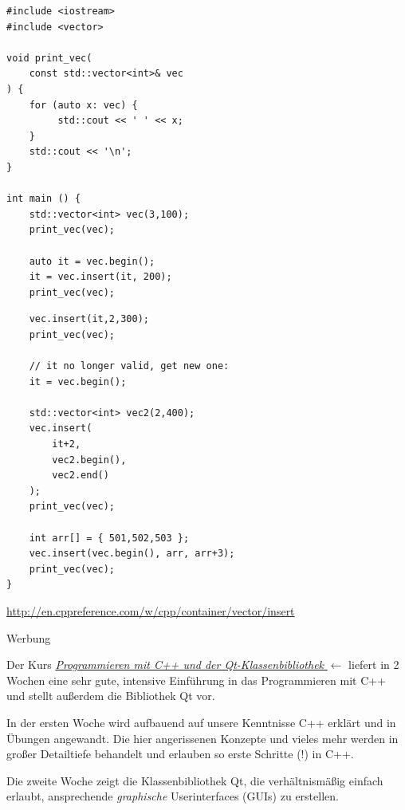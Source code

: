 \begin{frame}[fragile]
%
%
\begin{codebox}
\begin{verbatim}
#include <iostream>
#include <vector>
 
void print_vec(
    const std::vector<int>& vec
) {
    for (auto x: vec) {
         std::cout << ' ' << x;
    }
    std::cout << '\n';
}
 
int main () {
    std::vector<int> vec(3,100);
    print_vec(vec);
 
    auto it = vec.begin();
    it = vec.insert(it, 200);
    print_vec(vec);
\end{verbatim}
\end{codebox}
%	
\begin{codebox}
\begin{verbatim}
    vec.insert(it,2,300);
    print_vec(vec);
 
    // it no longer valid, get new one:
    it = vec.begin();
 
    std::vector<int> vec2(2,400);
    vec.insert(
        it+2, 
        vec2.begin(), 
        vec2.end()
    );
    print_vec(vec);
 
    int arr[] = { 501,502,503 };
    vec.insert(vec.begin(), arr, arr+3);
    print_vec(vec);
}
\end{verbatim}
\tiny \url{http://en.cppreference.com/w/cpp/container/vector/insert}
\end{codebox}
%
\end{frame}


\begin{frame}{Werbung}
%
\begin{tcolorbox}
Der Kurs \href{http://www.physik.uni-regensburg.de/studium/it/c++kurs}{\thus \emph{Programmieren mit C++ und der Qt-Klassenbibliothek} $\leftarrow$} liefert in 2 Wochen eine sehr gute, intensive Einführung in das Programmieren mit C++ und stellt außerdem die Bibliothek Qt vor.

\vspace{3pt}
In der ersten Woche wird aufbauend auf unsere Kenntnisse C++ erklärt und in Übungen angewandt. Die hier angerissenen Konzepte und vieles mehr werden in großer Detailtiefe behandelt und erlauben so erste Schritte (!) in C++.

\vspace{3pt}
Die zweite Woche zeigt die Klassenbibliothek Qt, die verhältnismäßig einfach erlaubt, ansprechende \emph{graphische} Userinterfaces (GUIs) zu erstellen.
\end{tcolorbox}
%
\end{frame}